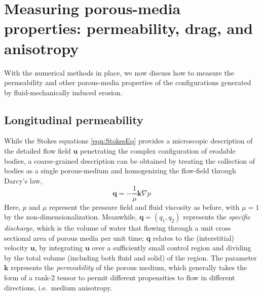 \documentclass[3p]{elsarticle}
\newcommand{\grad}{{\nabla}}
\newcommand{\uu}{{\mathbf{u}}}
\newcommand{\thL}{$\theta$--$L$}
\newcommand{\bvec}[1]{\mathbf{#1}}
\newcommand {\bq} {\bvec{q}}
\begin{document}


\section{Measuring porous-media properties: permeability, drag, and anisotropy}
\label{sec:medium}

With the numerical methods in place, we now discuss how to measure the permeability and other porous-media properties of the configurations generated by fluid-mechanically induced erosion.

\subsection{Longitudinal permeability}
\label{LongPerm}

While the Stokes equations \eqref{eqn:StokesEq} provides a microscopic description of the detailed flow field $\uu$ penetrating the complex configuration of erodable bodies, a coarse-grained description can be obtained by treating the collection of bodies as a single porous-medium and homogenizing the flow-field through Darcy's law,
\begin{equation}
\label{eqn:Darcy}
\bq = - \frac{1}{\mu} \bvec{k} \grad p
\end{equation}
Here, $p$ and $\mu$ represent the pressure field and fluid viscosity as before, with $\mu = 1$ by the non-dimensionalization. Meanwhile, $\bq = (q_1, q_2)$ represents the {\em specific discharge}, which is the volume of water that flowing through a unit cross sectional area of porous media per unit time; $\bq$ relates to the (interstitial) velocity $\uu$, by integrating $\uu$ over a sufficiently small control region and dividing by the total volume (including both fluid and solid) of the region. The parameter $\bvec{k}$ represents the {\em permeability} of the porous medium, which generally takes the form of a rank-2 tensor to permit different propensities to flow in different directions, i.e.~medium anisotropy. 
\end{document}
